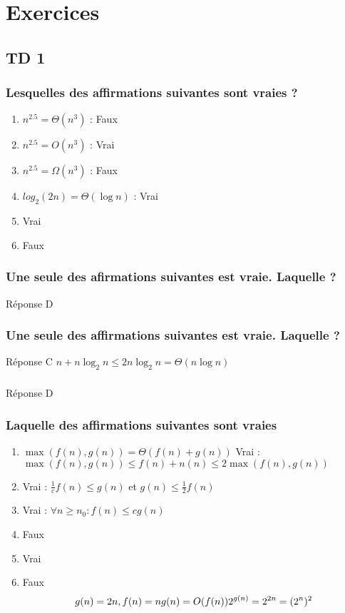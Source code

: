 \chapter{Exercices}
\section{TD 1}
\subsection{Lesquelles des affirmations suivantes sont vraies ?}
\begin{enumerate}
	\item $n^2.5 = \Theta(n^3)$ : Faux 
	\item $n^2.5 = O(n^3)$ : Vrai 
	\item $n^2.5 = \Omega(n^3)$ : Faux
	\item $log_2(2n) = \Theta(\log n)$ : Vrai
	\item Vrai
	\item Faux
\end{enumerate}
\subsection{Une seule des afirmations suivantes est vraie. Laquelle ?}
Réponse D
\subsection{Une seule des affirmations suivantes est vraie. Laquelle ?}
Réponse C
$n + n\log_2 n \leq 2 n\log_2 n= \Theta(n \log n)$
\subsection{}
Réponse D
\subsection{Laquelle des affirmations suivantes sont vraies}
\begin{enumerate}
	\item $\max{(f(n),g(n))} = \Theta(f(n)+g(n))$ Vrai : $\max (f(n), g(n)) \leq f(n) + n(n) \leq 2 \max(f(n),g(n))$
	\item Vrai : $\frac{1}{c}f(n) \leq g(n)$ et $g(n) \leq \frac{1}{2}f(n)$
	\item Vrai : $\forall n \geq n_0 : f(n) \leq c g(n)$
	\item Faux
	\item Vrai
	\item Faux \\
		$$g(n) = 2n, f(n) = n\\ g(n) = O(f(n))\\ 2^{g(n)} = 2^{2n} = (2^n)^2$$
\end{enumerate}

